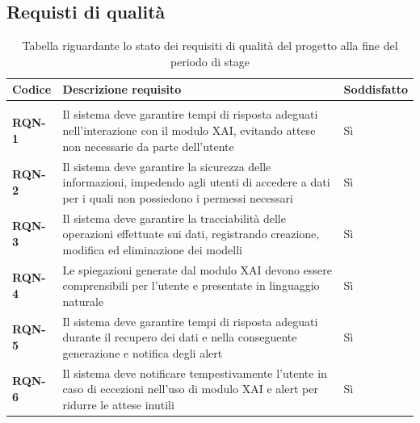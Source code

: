 \subsection{Requisti di qualità}
\keepXColumns
{}
    \begin{longtable}{|l|p{}|l|}
        \hline
        \rowcolor{gold}
        \textbf{Codice} & \textbf{Descrizione requisito} & \textbf{Soddisfatto} \\
        \hline
        \endhead

        \hline
        \rowcolor{white}
        \caption{Tabella riguardante lo stato dei requisiti di qualità del progetto alla fine del periodo di stage} \label{tab:requisiti_stato_qualitativi} \\
        \endlastfoot 

        \textbf{RQN-1} & Il sistema deve garantire tempi di risposta adeguati nell'interazione con il modulo XAI, evitando attese non necessarie da parte dell'utente & Sì \\
        \hline
        \textbf{RQN-2} & Il sistema deve garantire la sicurezza delle informazioni, impedendo agli utenti di accedere a dati per i quali non possiedono i permessi necessari & Sì \\
        \hline
        \textbf{RQN-3} & Il sistema deve garantire la tracciabilità delle operazioni effettuate sui dati, registrando creazione, modifica ed eliminazione dei modelli & Sì \\
        \hline
        \textbf{RQN-4} & Le spiegazioni generate dal modulo XAI devono essere comprensibili per l'utente e presentate in linguaggio naturale & Sì \\
        \hline
        \textbf{RQN-5} & Il sistema deve garantire tempi di risposta adeguati durante il recupero dei dati e nella conseguente generazione e notifica degli alert & Sì \\
        \hline
        \textbf{RQN-6} & Il sistema deve notificare tempestivamente l'utente in caso di eccezioni nell'uso di modulo XAI e alert per ridurre le attese inutili & Sì \\
    \end{longtable}

\newpage
